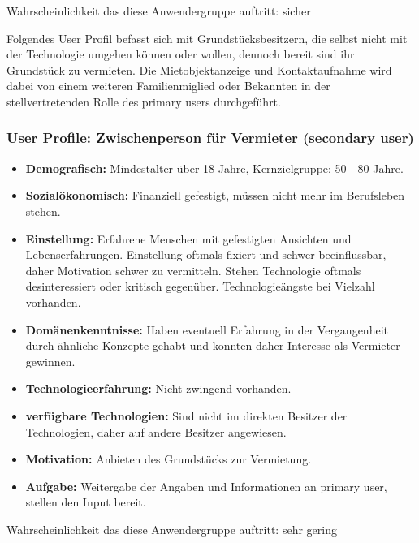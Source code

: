 Wahrscheinlichkeit das diese Anwendergruppe auftritt: sicher


\newpage
Folgendes User Profil befasst sich mit Grundstücksbesitzern, die selbst nicht mit der Technologie umgehen können oder wollen, dennoch bereit sind ihr Grundstück zu vermieten.
Die Mietobjektanzeige und Kontaktaufnahme wird dabei von einem weiteren Familienmiglied oder Bekannten in der stellvertretenden Rolle des primary users durchgeführt.\\

\subsubsection{User Profile: Zwischenperson für Vermieter (secondary user)}
\begin{itemize}
   \item 
   \textbf{Demografisch:} Mindestalter über 18 Jahre, Kernzielgruppe: 50 - 80 Jahre.  

   \item 
  \textbf{Sozialökonomisch:} Finanziell gefestigt, müssen nicht mehr im Berufsleben stehen. 

   \item 
   \textbf{Einstellung:} Erfahrene Menschen mit gefestigten Ansichten und Lebenserfahrungen. Einstellung oftmals fixiert und schwer beeinflussbar, daher Motivation schwer zu vermitteln.
   Stehen Technologie oftmals desinteressiert oder kritisch gegenüber. Technologieängste bei Vielzahl vorhanden.

   \item 
   \textbf{Domänenkenntnisse:} Haben eventuell Erfahrung in der Vergangenheit durch ähnliche Konzepte gehabt und konnten daher Interesse als Vermieter gewinnen.

   \item
   \textbf{Technologieerfahrung:} Nicht zwingend vorhanden. 

   \item
   \textbf{verfügbare Technologien:} Sind nicht im direkten Besitzer der Technologien, daher auf andere Besitzer angewiesen.

   \item
   \textbf{Motivation:} Anbieten des Grundstücks zur Vermietung.

   \item
   \textbf{Aufgabe:} Weitergabe der Angaben und Informationen an primary user, stellen den Input bereit.
   
\end{itemize}
Wahrscheinlichkeit das diese Anwendergruppe auftritt: sehr gering


